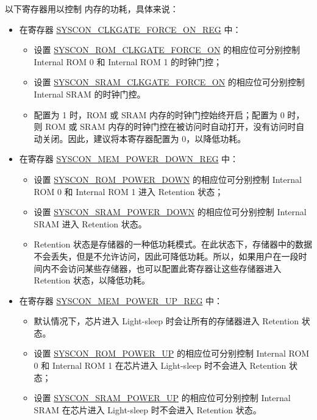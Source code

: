 \documentclass[main\_\_CN.tex]{subfiles}
\begin{document}
以下寄存器用以控制 \chipname{} 内存的功耗，具体来说：

\begin{itemize}
    \item 在寄存器 \hyperref[regdesc:SYSCONCLKGATEFORCEONREG]{SYSCON\_CLKGATE\_FORCE\_ON\_REG} 中：
    \begin{itemize}
        \item 设置 \hyperref[fielddesc:SYSCONROMCLKGATEFORCEON]{SYSCON\_ROM\_CLKGATE\_FORCE\_ON} 的相应位可分别控制 Internal ROM 0 和 Internal ROM 1 的时钟门控；
        \item 设置 \hyperref[fielddesc:SYSCONSRAMCLKGATEFORCEON]{SYSCON\_SRAM\_CLKGATE\_FORCE\_ON} 的相应位可分别控制 Internal SRAM 的时钟门控。
        \item 配置为 1 时，ROM 或 SRAM 内存的时钟门控始终开启；配置为 0 时，则 ROM 或 SRAM 内存的时钟门控在被访问时自动打开，没有访问时自动关闭。因此，建议将本寄存器配置为 0，以降低功耗。
    \end{itemize}
    \item 在寄存器 \hyperref[regdesc:SYSCONMEMPOWERDOWNREG]{SYSCON\_MEM\_POWER\_DOWN\_REG} 中：
    \begin{itemize}
        \item 设置 \hyperref[fielddesc:SYSCONROMPOWERDOWN]{SYSCON\_ROM\_POWER\_DOWN} 的相应位可分别控制 Internal ROM 0 和 Internal ROM 1 进入 Retention 状态；
        \item 设置 \hyperref[fielddesc:SYSCONSRAMPOWERDOWN]{SYSCON\_SRAM\_POWER\_DOWN} 的相应位可分别控制 Internal SRAM 进入 Retention 状态。
        \item Retention 状态是存储器的一种低功耗模式。在此状态下，存储器中的数据不会丢失，但是不允许访问，因此可降低功耗。所以，如果用户在一段时间内不会访问某些存储器，也可以配置此寄存器让这些存储器进入 Retention 状态，以降低功耗。
    \end{itemize}
    \item 在寄存器 \hyperref[regdesc:SYSCONMEMPOWERUPREG]{SYSCON\_MEM\_POWER\_UP\_REG} 中：
    \begin{itemize}
        \item 默认情况下，芯片进入 Light-sleep 时会让所有的存储器进入 Retention 状态。
        \item 设置 \hyperref[fielddesc:SYSCONROMPOWERUP]{SYSCON\_ROM\_POWER\_UP} 的相应位可分别控制 Internal ROM 0 和 Internal ROM 1 在芯片进入 Light-sleep 时不会进入 Retention 状态；
        \item 设置 \hyperref[fielddesc:SYSCONSRAMPOWERUP]{SYSCON\_SRAM\_POWER\_UP} 的相应位可分别控制 Internal SRAM 在芯片进入 Light-sleep 时不会进入 Retention 状态。
    \end{itemize}
\end{itemize}
\end{document}
